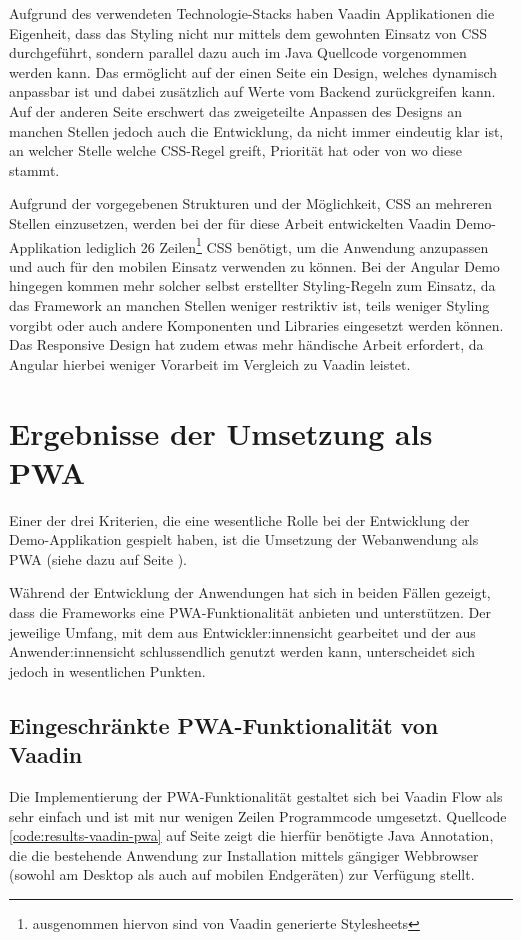 \documentclass[a4paper,12pt,twoside]{scrreprt}
\begin{document}
Aufgrund des verwendeten Technologie-Stacks haben Vaadin Applikationen die Eigenheit, dass das Styling nicht nur mittels dem gewohnten Einsatz von \ac{CSS} durchgeführt, sondern parallel dazu auch im Java Quellcode vorgenommen werden kann. Das ermöglicht auf der einen Seite ein Design, welches dynamisch anpassbar ist und dabei zusätzlich auf Werte vom Backend zurückgreifen kann. Auf der anderen Seite erschwert das zweigeteilte Anpassen des Designs an manchen Stellen jedoch auch die Entwicklung, da nicht immer eindeutig klar ist, an welcher Stelle welche \ac{CSS}-Regel greift, Priorität hat oder von wo diese stammt.

\medskip

Aufgrund der vorgegebenen Strukturen und der Möglichkeit, \ac{CSS} an mehreren Stellen einzusetzen, werden bei der für diese Arbeit entwickelten Vaadin Demo-Applikation lediglich 26 Zeilen\footnote{ausgenommen hiervon sind von Vaadin generierte Stylesheets} \ac{CSS} benötigt, um die Anwendung anzupassen und auch für den mobilen Einsatz verwenden zu können. Bei der Angular Demo hingegen kommen mehr solcher selbst erstellter Styling-Regeln zum Einsatz, da das Framework an manchen Stellen weniger restriktiv ist, teils weniger Styling vorgibt oder auch andere Komponenten und Libraries eingesetzt werden können. Das Responsive Design hat zudem etwas mehr händische Arbeit erfordert, da Angular hierbei weniger Vorarbeit im Vergleich zu Vaadin leistet.

\section{Ergebnisse der Umsetzung als \acs{PWA}}
\label{sec:ergebnisse-umsetzung-pwa}
Einer der drei Kriterien, die eine wesentliche Rolle bei der Entwicklung der Demo-Applikation gespielt haben, ist die Umsetzung der Webanwendung als \ac{PWA} (siehe dazu \textit{} auf Seite \pageref{sub-sec:kriterien-pwa}).

Während der Entwicklung der Anwendungen hat sich in beiden Fällen gezeigt, dass die Frameworks eine \ac{PWA}-Funktionalität anbieten und unterstützen. Der jeweilige Umfang, mit dem aus Entwickler:innensicht gearbeitet und der aus Anwender:innensicht schlussendlich genutzt werden kann, unterscheidet sich jedoch in wesentlichen Punkten.

\subsection{Eingeschränkte \acs{PWA}-Funktionalität von Vaadin}
\label{sub-sec:results-pwa-vaadin}
Die Implementierung der \ac{PWA}-Funktionalität gestaltet sich bei Vaadin Flow als sehr einfach und ist mit nur wenigen Zeilen Programmcode umgesetzt. Quellcode \ref{code:results-vaadin-pwa} auf Seite \pageref{code:results-vaadin-pwa} zeigt die hierfür benötigte Java Annotation, die die bestehende Anwendung zur Installation mittels gängiger Webbrowser (sowohl am Desktop als auch auf mobilen Endgeräten) zur Verfügung stellt.
\end{document}
